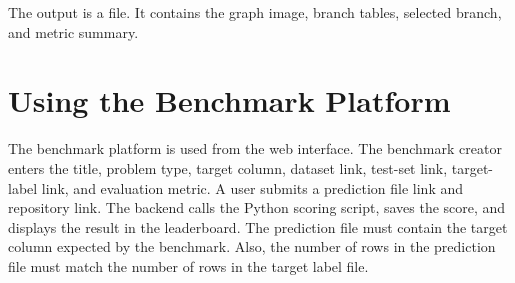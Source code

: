 \documentclass[12pt,a4paper,oneside]{report}
\DeclareRobustCommand{\modulepath}[1]{\path{#1}}
\begin{document}
\noindent The output is a \modulepath{report.html} file. It contains the graph image,
branch tables, selected branch, and metric summary.

\section{Using the Benchmark Platform}

The benchmark platform is used from the web interface. The benchmark creator
enters the title, problem type, target column, dataset link, test-set link,
target-label link, and evaluation metric. A user submits a prediction file link
and repository link. The backend calls the Python scoring script, saves the
score, and displays the result in the leaderboard. The prediction file must contain the target column expected by the benchmark.
Also, the number of rows in the prediction file must match the number of rows
in the target label file.
\end{document}
